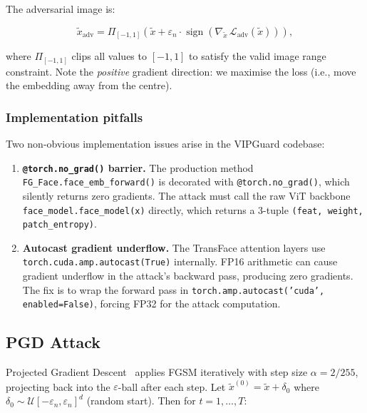 \documentclass[12pt,a4paper]{article}
\newcommand{\sign}{\operatorname{sign}}
\begin{document}
The adversarial image is:

\begin{equation}
  \tilde{x}_{\text{adv}} =
  \Pi_{[-1,1]}\!\left(
    \tilde{x} + \varepsilon_n \cdot \sign\!\left(\nabla_{\tilde{x}}\,
    \mathcal{L}_{\text{adv}}(\tilde{x})\right)
  \right),
  \label{eq:fgsm}
\end{equation}

where $\Pi_{[-1,1]}$ clips all values to $[-1,1]$ to satisfy the valid image
range constraint.  Note the \emph{positive} gradient direction: we maximise the
loss (i.e., move the embedding away from the centre).

\subsubsection*{Implementation pitfalls}

Two non-obvious implementation issues arise in the VIPGuard codebase:

\begin{enumerate}[leftmargin=*]
  \item \textbf{\texttt{@torch.no\_grad()} barrier.}  The production method
  \texttt{FG\_Face.face\_emb\_forward()} is decorated with
  \texttt{@torch.no\_grad()}, which silently returns zero gradients.  The attack
  must call the raw ViT backbone \texttt{face\_model.face\_model(x)} directly,
  which returns a 3-tuple \texttt{(feat, weight, patch\_entropy)}.

  \item \textbf{Autocast gradient underflow.}  The TransFace attention layers use
  \texttt{torch.cuda.amp.autocast(True)} internally.  FP16 arithmetic can cause
  gradient underflow in the attack's backward pass, producing zero gradients.
  The fix is to wrap the forward pass in
  \texttt{torch.amp.autocast('cuda', enabled=False)}, forcing FP32 for the
  attack computation.
\end{enumerate}

\subsection{PGD Attack}
\label{sec:pgd}

Projected Gradient Descent~\cite{madry2018towards} applies FGSM iteratively
with step size $\alpha = 2/255$, projecting back into the $\varepsilon$-ball
after each step.  Let $\tilde{x}^{(0)} = \tilde{x} + \delta_0$ where
$\delta_0 \sim \mathcal{U}[-\varepsilon_n, \varepsilon_n]^d$ (random start).
Then for $t = 1, \ldots, T$:
\end{document}
